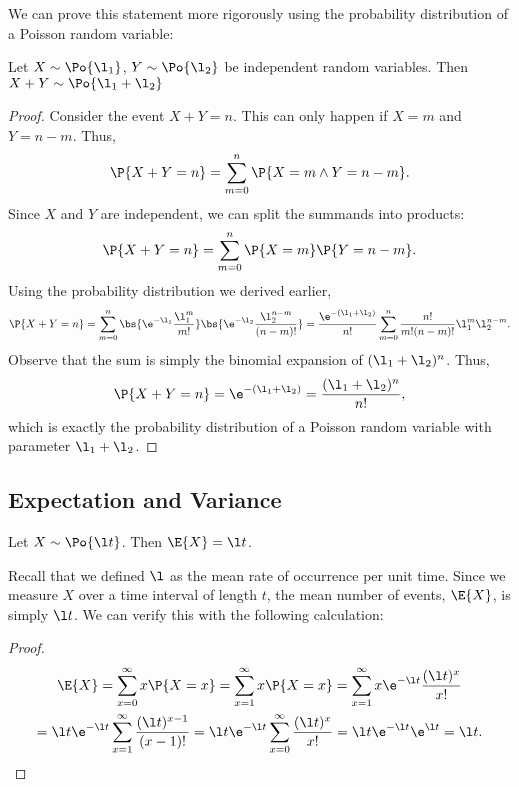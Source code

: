 We can prove this statement more rigorously using the probability distribution of a Poisson random variable:

\begin{proposition}
    Let $X \sim \Po{\l_1}$, $Y \sim \Po{\l_2}$ be independent random variables. Then $X + Y \sim \Po{\l_1 + \l_2}$
\end{proposition}
\begin{proof}
    Consider the event $X + Y = n$. This can only happen if $X = m$ and $Y = n - m$. Thus, \[\P{X + Y = n} = \sum_{m = 0}^n \P{X = m \land Y = n -m}.\] Since $X$ and $Y$ are independent, we can split the summands into products: \[\P{X + Y = n} = \sum_{m = 0}^n \P{X = m} \P{Y = n -m}.\] Using the probability distribution we derived earlier, \[\P{X + Y = n} = \sum_{m = 0}^n \bs{\e^{-\l_1} \frac{\l_1^m}{m!}} \bs{\e^{-\l_2} \frac{\l_2^{n-m}}{(n-m)!}} = \frac{\e^{-(\l_1 + \l_2)}}{n!} \sum_{m = 0}^n \frac{n!}{m! (n-m)!} \l_1^m \l_2^{n-m}.\] Observe that the sum is simply the binomial expansion of $(\l_1 + \l_2)^{n}$. Thus, \[\P{X + Y = n} = \e^{-(\l_1 + \l_2)} = \frac{(\l_1 + \l_2)^n}{n!},\] which is exactly the probability distribution of a Poisson random variable with parameter $\l_1 + \l_2$.
\end{proof}

\subsection{Expectation and Variance}


\begin{proposition}
    Let $X \sim \Po{\l t}$. Then $\E{X} = \l t$.
\end{proposition}
Recall that we defined $\l$ as the mean rate of occurrence per unit time. Since we measure $X$ over a time interval of length $t$, the mean number of events, $\E{X}$, is simply $\l t$. We can verify this with the following calculation:
\begin{proof}
    \begin{gather*}
        \E{X} = \sum_{x = 0}^\infty  x \P{X = x} = \sum_{x = 1}^\infty  x \P{X = x} = \sum_{x = 1}^\infty  x \e^{-\l t} \frac{(\l t)^x}{x!}\\
        = \l t \e^{-\l t} \sum_{x = 1}^\infty \frac{(\l t)^{x-1}}{(x-1)!} = \l t \e^{-\l t} \sum_{x = 0}^\infty \frac{(\l t)^x}{x!} = \l t \e^{-\l t} \e^{\l t} = \l t.
    \end{gather*}
\end{proof}

